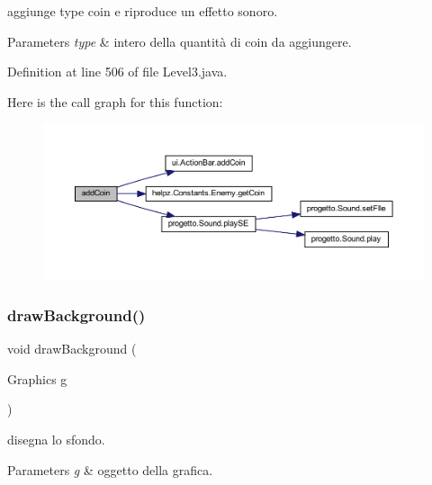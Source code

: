aggiunge \textquotesingle{}type\textquotesingle{} coin e riproduce un effetto sonoro. 


\begin{DoxyParams}{Parameters}
{\em type} & intero della quantità di coin da aggiungere. \\
\hline
\end{DoxyParams}


Definition at line 506 of file Level3.\+java.

Here is the call graph for this function\+:\nopagebreak
\begin{figure}[H]
\begin{center}
\leavevmode
\includegraphics[width=350pt]{classscenes_1_1_level3_a9f0f7dc28e596d2ebcd06e27ef05d9fd_cgraph}
\end{center}
\end{figure}
\mbox{\label{classscenes_1_1_level3_a62bcb07be9e39896e5837a9d396e7235}} 
\subsubsection{\texorpdfstring{draw\+Background()}{drawBackground()}}
{\footnotesize\ttfamily void draw\+Background (\begin{DoxyParamCaption}\item[{Graphics}]{g }\end{DoxyParamCaption})\hspace{0.3cm}{\ttfamily [private]}}



disegna lo sfondo. 


\begin{DoxyParams}{Parameters}
{\em g} & oggetto della grafica. \\
\hline
\end{DoxyParams}


